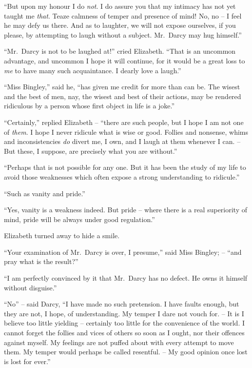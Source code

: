 “But upon my honour I do \textit{not}. I do assure you that
my intimacy has not yet taught me \textit{that}. Teaze calmness of
temper and presence of mind! No, no -- I feel he may defy
us there. And as to laughter, we will not expose ourselves,
if you please, by attempting to laugh without a subject.
Mr.\ Darcy may hug himself.”

“Mr.\ Darcy is not to be laughed at!” cried Elizabeth.
“That is an uncommon advantage, and uncommon I hope
it will continue, for it would be a great loss to \textit{me} to have
many such acquaintance. I dearly love a laugh.”

“Miss Bingley,” said he, “has given me credit for more
than can be. The wisest and the best of men, nay, the
wisest and best of their actions, may be rendered ridiculous
by a person whose first object in life is a joke.”

“Certainly,” replied Elizabeth -- “there are such people,
but I hope I am not one of \textit{them}. I hope I never ridicule
what is wise or good. Follies and nonsense, whims and
inconsistencies \textit{do} divert me, I own, and I laugh at them
whenever I can. -- But these, I suppose, are precisely what
you are without.”

“Perhaps that is not possible for any one. But it has
been the study of my life to avoid those weaknesses which
often expose a strong understanding to ridicule.”

“Such as vanity and pride.”

“Yes, vanity is a weakness indeed. But pride -- where
there is a real superiority of mind, pride will be always
under good regulation.”

Elizabeth turned away to hide a smile.

“Your examination of Mr.\ Darcy is over, I presume,”
said Miss Bingley; -- “and pray what is the result?”

“I am perfectly convinced by it that Mr.\ Darcy has
no defect. He owns it himself without disguise.”

“No” -- said Darcy, “I have made no such pretension.
I have faults enough, but they are not, I hope, of understanding.
My temper I dare not vouch for. -- It is I believe
too little yielding -- certainly too little for the convenience
of the world. I cannot forget the follies and vices of others
so soon as I ought, nor their offences against myself.
My feelings are not puffed about with every attempt to
move them. My temper would perhaps be called
resentful. -- My good opinion once lost is lost for ever.”

